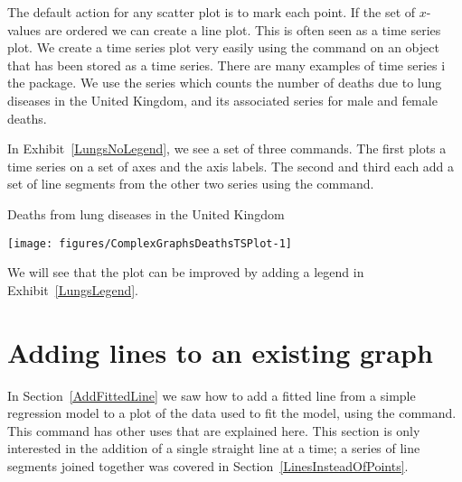 The default action for any scatter plot is to mark each point. If the set of $x$-values are ordered we can create a line plot. This is often seen as a time series plot. We create a time series plot very easily using the  command on an object that has been stored as a time series. There are many examples of time series i the  package. We use the  series which counts the number of deaths due to lung diseases in the United Kingdom, and its associated series for male and female deaths. 
 
In Exhibit~\ref{LungsNoLegend}, we see a set of three commands. The first plots a time series on a set of axes and the axis labels. The second and third each add a set of line segments from the other two series using the  command. 
 
\begin{exhibit} 
\begin{center} 
\caption{Deaths from lung diseases in the United Kingdom} 
\label{LungsNoLegend} 
\begin{knitrout}
\color{fgcolor}\begin{kframe}
\begin{alltt}
\hlstd{> } \hlstd{=}\hlstd{(}\hlstd{,}\hlstd{),} \hlstd{=}\hlstd{,} \hlstd{=}\hlstd{)}
\hlstd{> } \hlstd{=}\hlstd{)}
\hlstd{> } \hlstd{=}\hlstd{)}
\end{alltt}
\end{kframe}
\texttt{[image: figures/ComplexGraphsDeathsTSPlot-1]} 

\end{knitrout}
\end{center} 
\end{exhibit} 
 
We will see that the plot can be improved by adding a legend in Exhibit~\ref{LungsLegend}. 
 
 
\section{Adding lines to an existing graph} 
 
In Section~\ref{AddFittedLine} we saw how to add a fitted line from a simple regression model to a plot of the data used to fit the model, using the  command. This command has other uses that are explained here. This section is only interested in the addition of a single straight line at a time; a series of line segments joined together was covered in Section~\ref{LinesInsteadOfPoints}. 
 
